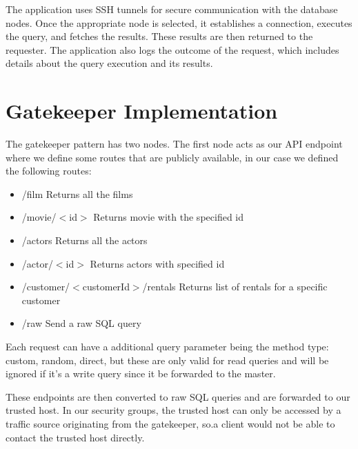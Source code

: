\documentclass[11pt]{article}
\begin{document}
The application uses SSH tunnels for secure communication with the database nodes. Once the appropriate node is selected, it establishes a connection, executes the query, and fetches the results. These results are then returned to the requester. The application also logs the outcome of the request, which includes details about the query execution and its results.

\section{Gatekeeper Implementation}
The gatekeeper pattern has two nodes. The first node acts as our API endpoint where we define some routes that are publicly available, in our case we defined the following routes:
\begin{itemize}
	\item /film Returns all the films
	\item /movie/$<$id$>$ Returns movie with the specified id
	\item /actors Returns all the actors
	\item /actor/$<$id$>$ Returns actors with specified id
	\item /customer/$<$customerId$>$/rentals Returns list of rentals for a specific customer
	\item /raw Send a raw SQL query
\end{itemize}

\newline
Each request can have a additional query parameter being the method type: custom, random, direct, but these are only valid for read queries and will be ignored if it's a write query since it be forwarded to the master.

\noindent
These endpoints are then converted to raw SQL queries and are forwarded to our trusted host. In our security groups, the trusted host can only be accessed by a traffic source originating from the gatekeeper, so.a client would not be able to contact the trusted host directly.
\newline
\end{document}
